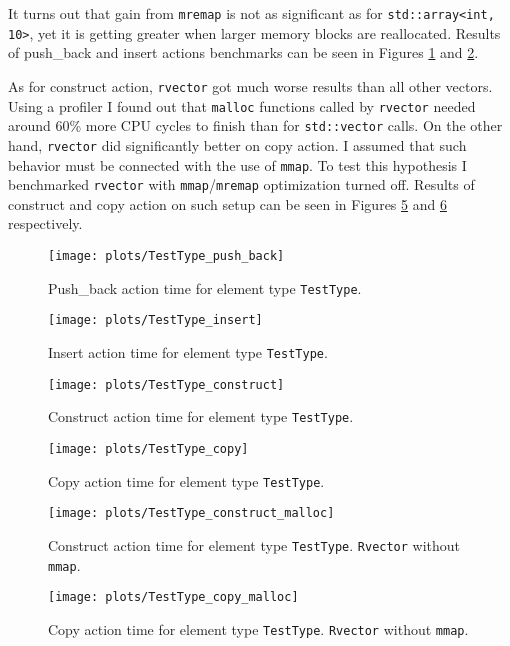 \documentclass[inz, english, shortabstract]{iithesis}
\begin{document}
It turns out that gain from {\tt mremap} is not as significant as for \lstinline{std::array<int, 10>}, yet it is getting greater when larger memory blocks are reallocated. Results of push\_back and insert actions benchmarks can be seen in Figures \ref{TestType_push_back} and \ref{TestType_insert}. 

As for construct action, {\tt rvector} got much worse results than all other vectors. Using a profiler I found out that {\tt malloc} functions called by {\tt rvector} needed around 60\% more CPU cycles to finish than for {\tt std::vector} calls. On the other hand, {\tt rvector} did significantly better on copy action. I assumed that such behavior must be connected with the use of {\tt mmap}. To test this hypothesis I benchmarked {\tt rvector} with {\tt mmap}/{\tt mremap} optimization turned off. Results of construct and copy action on such setup can be seen in Figures \ref{TestType_construct_malloc} and \ref{TestType_copy_malloc} respectively.

\begin{figure}[h!]
\texttt{[image: plots/TestType\_push\_back]}
\caption{Push\_back action time for element type \lstinline{TestType}.}
\label{TestType_push_back}
\end{figure}

\begin{figure}[h!]
\texttt{[image: plots/TestType\_insert]}
\caption{Insert action time for element type \lstinline{TestType}.}
\label{TestType_insert}
\end{figure}

\begin{figure}[h!]
\texttt{[image: plots/TestType\_construct]}
\caption{Construct action time for element type \lstinline{TestType}.}
\label{TestType_construct}
\end{figure}

\begin{figure}[h!]
\texttt{[image: plots/TestType\_copy]}
\caption{Copy action time for element type \lstinline{TestType}.}
\label{TestType_copy}
\end{figure}


\begin{figure}[h!]
\texttt{[image: plots/TestType\_construct\_malloc]}
\caption{Construct action time for element type \lstinline{TestType}. {\tt Rvector} without {\tt mmap}.}
\label{TestType_construct_malloc}
\end{figure}

\begin{figure}[h!]
\texttt{[image: plots/TestType\_copy\_malloc]}
\caption{Copy action time for element type \lstinline{TestType}. {\tt Rvector} without {\tt mmap}.}
\label{TestType_copy_malloc}
\end{figure}
\end{document}
